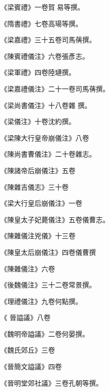 \begin{pinyinscope}
 《梁賓禮》一卷賀易等撰。



 《隋書禮》七卷高瑒等撰。



 《梁嘉禮》三十五卷司馬蒨撰。



 《陳賓禮儀注》六卷張彥志。



 《梁軍禮》四卷陸璉撰。



 《梁嘉禮儀注》二十一卷司馬蒨撰。



 《梁尚書儀注》十八卷雜
 撰。



 《梁儀注》十卷沈約撰。



 《梁陳大行皇帝崩儀注》八卷



 《陳尚書曹儀注》二十卷雜志。



 《陳諸帝后崩儀注》五卷



 《陳雜吉儀志》三十卷



 《梁大行皇后崩儀注》一卷



 《陳皇太子妃薨儀注》五卷儀曹志。



 《陳雜儀注兇儀》十三卷



 《陳皇太后崩儀注》四卷儀曹撰



 《陳雜儀注》六卷



 《後魏儀注》三十二卷常景撰。



 《理禮儀注》九卷何點撰。



 《
 晉謚議》八卷



 《魏明帝謚議》二卷何晏撰。



 《魏氏郊丘》三卷



 《晉簡文謚議》四卷



 《晉明堂郊社議》三卷孔朝等撰。




\end{pinyinscope}
